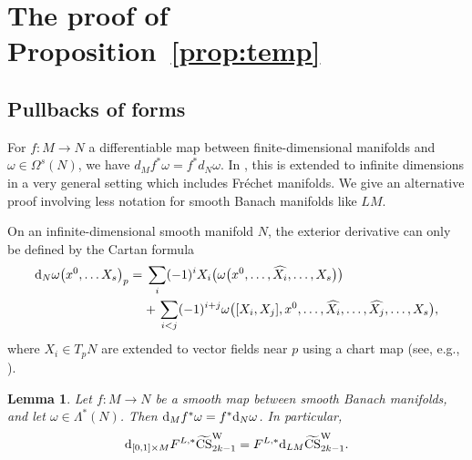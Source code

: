 \documentclass[pdftex]{sigma}
\numberwithin{equation}{section}
\newtheorem{Lemma}[Theorem]{Lemma}
\theoremstyle{definition}
\newcommand{\kk}{2k-1 }
\newcommand{\bm}{ M}
\newcommand{\ocs}{\widetilde{{\rm CS}}}
\newcommand{\itbm}{[0,1]\times M}
\begin{document}
\section{The proof of Proposition~\ref{prop:temp}}\label{app:oldB}

\subsection{Pullbacks of forms}%

 For $f\colon M\to N$ a differentiable map between finite-dimensional manifolds and $\omega\in \Omega^s(N)$, we have $ d_{M}f^*\omega = f^* d_N \omega$.
In \cite[Section~33.15]{KM}, this is
 extended to infinite dimensions in a very general setting which includes Fr\'echet manifolds.
 We give an alternative proof involving less notation for smooth Banach manifolds like $LM$.

 On an infinite-dimensional smooth manifold $N$, the exterior derivative can only be defined by the Cartan formula
\begin{align*} {\rm d}_N\omega\bigl(x^0,\dots X_{s}\bigr)_p={}& \sum_i (-1)^i X_i \bigl( \omega\bigl(x^0,\dots,\widehat{X_i},\dots, X_{s}\bigr)\bigr)\\
&{}{+}\, \sum_{i<j} (-1)^{i+j}\omega\bigl([X_i,X_j], x^0,\dots, \widehat{X_i},\dots, \widehat{X_j},\dots,X_{s}\bigr),
\end{align*}
where $X_i\in T_pN$ are extended to vector fields near $p$ using a chart map (see, e.g., \cite[Section~33.12]{KM}).
\begin{Lemma} \label{lem:2.1} Let $f\colon M\to N$ be a smooth map between smooth Banach manifolds, and let $\omega\in \Lambda^*(N)$.
Then $ {\rm d}_Mf^*\omega = f^* {\rm d}_N \omega$. In particular,
\[
{\rm d}_{\itbm}F^{L,*}\ocs^{\rm W}_{\kk} = F^{L,*} {\rm d}_{L\bm} \ocs^{\rm W}_{\kk}.
\]
\end{Lemma}
\end{document}
